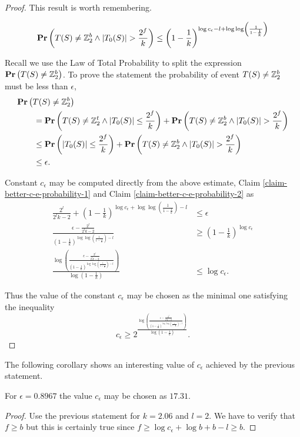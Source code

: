 \begin{proof}
This result is worth remembering.
\begin{claim}
\label{claim-better-c-e-probability-2}
\[
\mathbf{Pr}\left(T(S) \neq \mathbb{Z}_{2}^{b} \wedge |T_0(S)| > \frac {2 ^ f}{k}\right) \leq \left(1 - \frac{1}{k}\right) ^ {\log c_\epsilon - l + \log \log \left(\frac{1}{1 - \frac{1}{k}} \right)}
\]
\end{claim}

Recall we use the Law of Total Probability to split the expression $\mathbf{Pr}\left(T(S) \neq \mathbb{Z}_{2}^{b}\right)$. To prove the statement the probability of event $T(S) \neq \mathbb{Z}_{2}^{b}$ must be less than $\epsilon$,
\[
\begin{split}
& \mathbf{Pr}\left(T(S) \neq \mathbb{Z}_{2}^{b}\right) \\
	& \qquad = \mathbf{Pr}\left(T(S) \neq \mathbb{Z}_{2}^{t} \wedge |T_0(S)| \leq \frac {2 ^ f}{k}\right) + \mathbf{Pr}\left(T(S) \neq \mathbb{Z}_{2}^{b} \wedge |T_0(S)| > \frac {2 ^ f}{k}\right) \\
	& \qquad \leq \mathbf{Pr}\left(|T_0(S)| \leq \frac {2 ^ f}{k}\right) + \mathbf{Pr}\left(T(S) \neq \mathbb{Z}_{2}^{b} \wedge |T_0(S)| > \frac {2 ^ f}{k}\right) \\
	& \qquad \leq \epsilon \text{.}
\end{split}
\]

Constant $c_\epsilon$ may be computed directly from the above estimate, Claim \ref{claim-better-c-e-probability-1} and Claim \ref{claim-better-c-e-probability-2} as
\[
\begin{split}
\frac{2^l}{2^l k - 2} + \left(1 - \frac{1}{k}\right)^{\log c_\epsilon + \log \log \left( \frac{1}{1 - \frac{1}{k}} \right) - l} & \leq \epsilon \\
\frac{\epsilon - \frac{2^l}{2^l k - 2}}{\left(1 - \frac{1}{k}\right) ^ {\log \log \left(\frac{1}{1 - \frac{1}{k}}\right) - l}} & \geq \left(1 - \frac{1}{k}\right)^{\log c_\epsilon} \\
\frac{\log \left(\frac{\epsilon - \frac{2^l}{2^l k - 2}}{\left(1 - \frac{1}{k}\right) ^ {\log \log \left( \frac{1}{1 - \frac{1}{k}} \right) - l}}\right)}{\log \left(1 - \frac{1}{k}\right)} & \leq \log c_\epsilon \text{.}
\end{split}
\]

Thus the value of the constant $c_\epsilon$ may be chosen as the minimal one satisfying the inequality
\begin{equation}
\label{inequality-better-c-e}
c_\epsilon \geq 2 ^ {\frac{\log \left(\frac{\epsilon - \frac{2^l}{2^l k - 2}}{\left(1 - \frac{1}{k}\right) ^ {\log \log \left( \frac{1}{1 - \frac{1}{k}} \right) - l}}\right)}{\log \left(1 - \frac{1}{k}\right)}} \text{.}
\end{equation}
\end{proof}

The following corollary shows an interesting value of $c_\epsilon$ achieved by the previous statement.
\begin{corollary}
For $\epsilon = 0.8967$ the value $c_\epsilon$ may be chosen as $17.31$.
\end{corollary}
\begin{proof}
Use the previous statement for $k = 2.06$ and $l = 2$. We have to verify that $f \geq b$ but this is certainly true since $f \geq \log c_\epsilon + \log b + b - l \geq b$.
\end{proof}

